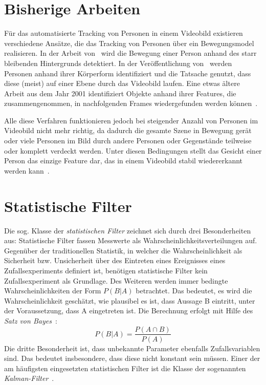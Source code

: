 \documentclass[a4paper, 11pt, twocolumn]{article}
\begin{document}

\section{Bisherige Arbeiten} %
\label{sec:bisherige_arbeiten}

Für das automatisierte Tracking von Personen in einem Videobild existieren verschiedene Ansätze, die das Tracking von Personen über ein Bewegungsmodel realisieren. 
In der Arbeit von~\cite{zhaoSegmentationTracking} wird die Bewegung einer Person anhand des starr bleibenden Hintergrunds detektiert. In der Veröffentlichung von~\cite{Zhao2004} werden Personen anhand ihrer Körperform identifiziert und die Tatsache genutzt, dass diese (meist) auf einer Ebene durch das Videobild laufen. Eine etwas ältere Arbeit aus dem Jahr 2001 identifiziert Objekte anhand ihrer Features, die zusammengenommen, in nachfolgenden Frames wiedergefunden werden können~\cite{Veenman2001}.

Alle diese Verfahren funktionieren jedoch bei steigender Anzahl von Personen im Videobild nicht mehr richtig, da dadurch die gesamte Szene in Bewegung gerät oder viele Personen im Bild durch andere Personen oder Gegenstände teilweise oder komplett verdeckt werden. Unter diesen Bedingungen stellt das Gesicht einer Person das einzige Feature dar, das in einem Videobild stabil wiedererkannt werden kann~\cite{aliMultipleHuman}.


\section{Statistische Filter} %
\label{sec:statistische_filter}

Die sog. Klasse der \emph{statistischen Filter} zeichnet sich durch drei Besonderheiten aus: Statistische Filter fassen Messwerte als Wahrscheinlichkeitsverteilungen auf. Gegenüber der traditionellen Statistik, in welcher die Wahrscheinlichkeit als Sicherheit bzw. Unsicherheit über des Eintreten eines Ereignisses eines Zufallsexperiments definiert ist, benötigen statistische Filter kein Zufallsexperiment als Grundlage. 
Des Weiteren werden immer bedingte Wahrscheinlichkeiten der Form $P(B|A)$ betrachtet. Das bedeutet, es wird die Wahrscheinlichkeit geschätzt, wie plausibel es ist, dass Aussage B eintritt, unter der Voraussetzung, dass A eingetreten ist. Die Berechnung erfolgt mit Hilfe des \emph{Satz von Bayes}~\cite{PapulaFormelsammlung2001}:
\[
	P(B|A) = \frac{P(A \cap B)}{P(A)}
\]
Die dritte Besonderheit ist, dass unbekannte Parameter ebenfalls Zufallsvariablen sind. Das bedeutet insbesondere, dass diese nicht konstant sein müssen.
Einer der am häufigsten eingesetzten statistischen Filter ist die Klasse der sogenannten \emph{Kalman-Filter}~\cite{MarslandBook}.
\end{document}
